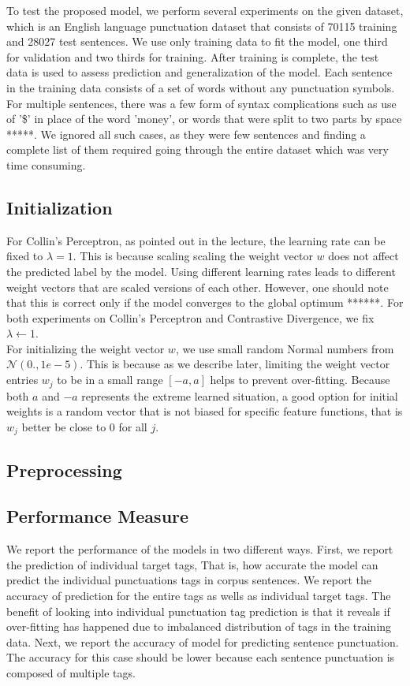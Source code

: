 \documentclass[twoside,12pt]{article}
\begin{document}
To test the proposed model, we perform several experiments on the given dataset, which is an English language punctuation dataset that consists of 70115 training and 28027 test sentences. We use only training data to fit the model,  one third for validation and two thirds for training.	 After training is complete, the test data is used to assess prediction and generalization of the model. Each sentence in the training data consists of a set of words without any punctuation symbols. For multiple sentences, there was a few form of syntax complications such as use of '\$' in place of the word 'money', or words that were split to two parts by space *****. We ignored all such cases, as they were few sentences and finding a complete list of them required going through the entire dataset which was very time consuming.\\


\subsection{Initialization}
For Collin's Perceptron, as pointed out in the lecture, the learning rate can be fixed to $\lambda=1$. This is because scaling scaling the weight vector $w$ does not affect the predicted label by the model. Using different learning rates leads to different weight vectors that are scaled versions of each other. However, one should note that this is correct only if the model converges to the global optimum ******. For both experiments on Collin's Perceptron and Contrastive Divergence, we fix $\lambda \leftarrow 1$. \\
For initializing the weight vector $w$, we use small random Normal numbers from $\mathcal N(0.,1e-5)$. This is because as we describe later, limiting the weight vector entries $w_j$ to be in a small range $[-a,a]$ helps to prevent over-fitting. Because both $a$ and $-a$ represents the extreme learned situation, a good option for initial weights is a random vector that is not biased for specific feature functions, that is $w_j$ better be close to 0 for all $j$.\\
\subsection{Preprocessing}
\subsection{Performance Measure}
We report the performance of the models in two different ways. First, we report the prediction of individual target tags, That is, how accurate the model can predict the individual punctuations tags in corpus sentences. We report the accuracy of prediction for the entire tags as wells as individual target tags. The benefit of looking into individual punctuation tag prediction is that it reveals if over-fitting has happened due to imbalanced distribution of tags in the training data. Next, we report the accuracy of model for predicting sentence punctuation. The accuracy for this case should be lower because each sentence punctuation is composed of multiple tags. 
\end{document}
